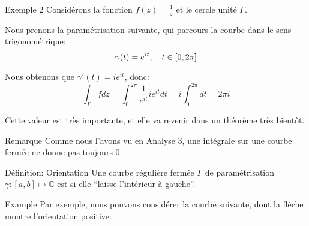 \documentclass[a4paper]{article}
\begin{document}
\begin{parag}{Exemple 2}
    Considérons la fonction $f\left(z\right) = \frac{1}{z}$ et le cercle unité $\Gamma$.

    Nous prenons la paramétrisation suivante, qui parcours la courbe dans le sens trigonométrique: 
    \[\gamma\left(t\right) = e^{it}, \mathspace t \in \left[0, 2\pi\right]\]
    
    Nous obtenons que $\gamma'\left(t\right) = ie^{it}$, donc: 
    \[\int_{\Gamma} f dz = \int_{0}^{2\pi} \frac{1}{e^{it}} ie^{it} dt = i \int_{0}^{2\pi} dt = 2\pi i\]

    Cette valeur est très importante, et elle va revenir dans un théorème très bientôt.

    \begin{subparag}{Remarque}
        Comme nous l'avons vu en Analyse 3, une intégrale sur une courbe fermée ne donne pas toujours 0.
    \end{subparag}
\end{parag}

\begin{parag}{Définition: Orientation}
    Une courbe régulière fermée $\Gamma$ de paramétrisation $\gamma : \left[a, b\right] \mapsto \mathbb{C}$ est  si elle ``laisse l'intérieur à gauche''.


    \begin{subparag}{Example}
        Par exemple, nous pouvons considérer la courbe suivante, dont la flèche montre l'orientation positive:
    \end{subparag}
\end{parag}
\end{document}
